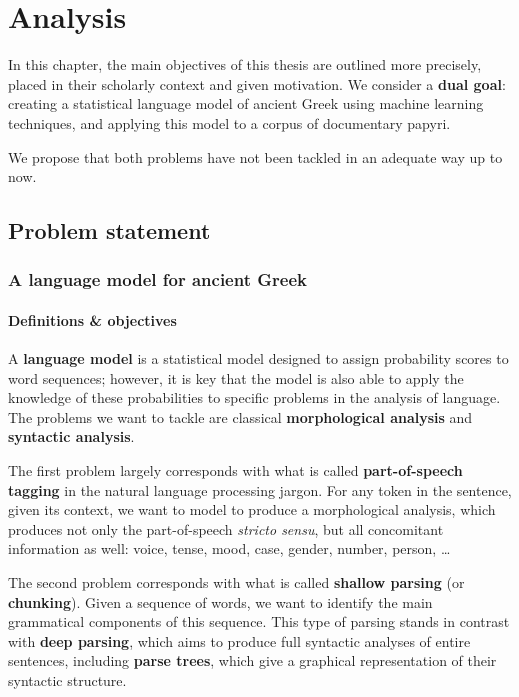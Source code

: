 
\chapter{Analysis}
\label{chp:analysis} %

In this chapter, the main objectives of this thesis are outlined more
precisely, placed in their scholarly context and given motivation. We
consider a \textbf{dual goal}: creating a statistical language model
of ancient Greek using machine learning techniques, and applying this
model to a corpus of documentary papyri.

We propose that both problems have not been tackled in an adequate way
up to now.

\section{Problem statement}

\subsection{A language model for ancient Greek}
\subsubsection{Definitions \& objectives} A \textbf{language model} is a statistical
model designed to assign probability scores to word sequences;
however, it is key that the model is also able to apply the knowledge
of these probabilities to specific problems in the analysis of
language. The problems we want to tackle are classical
\textbf{morphological analysis} and \textbf{syntactic analysis}.

The first problem largely corresponds with what is called
\textbf{part-of-speech tagging} in the natural language processing
jargon. For any token in the sentence, given its context, we want to
model to produce a morphological analysis, which produces not only the
part-of-speech \textit{stricto sensu}, but all concomitant information
as well: voice, tense, mood, case, gender, number, person, \ldots

The second problem corresponds with what is called \textbf{shallow
parsing} (or \textbf{chunking}). Given a sequence of words, we want to
identify the main grammatical components of this sequence.  This type
of parsing stands in contrast with \textbf{deep parsing}, which aims
to produce full syntactic analyses of entire sentences, including
\textbf{parse trees}, which give a graphical representation of their
syntactic structure.

